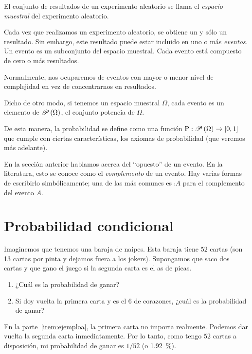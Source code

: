 El conjunto de resultados de un experimento aleatorio se llama el \emph{espacio muestral} del experimento aleatorio.

Cada vez que realizamos un experimento aleatorio, se obtiene un y sólo un resultado. Sin embargo, este resultado puede estar incluido en uno o más \emph{eventos.} Un evento es un subconjunto del espacio muestral. Cada evento está compuesto de cero o más resultados.

Normalmente, nos ocuparemos de eventos con mayor o menor nivel de complejidad en vez de concentrarnos en resultados.

Dicho de otro modo, si tenemos un espacio muestral \(\Omega\), cada evento es un elemento de \(\operatorname{\mathscr{P}}\left(\Omega\right)\), el conjunto potencia de \(\Omega\).

De esta manera, la probabilidad se define como una función \(\operatorname{P}: \operatorname{\mathscr{P}}\left(\Omega\right) \to [0,1]\) que cumple con ciertas características, los axiomas de probabilidad (que veremos más adelante).

En la sección anterior hablamos acerca del \enquote{opuesto} de un evento. En la literatura, esto se conoce como el \emph{complemento} de un evento. Hay varias formas de escribirlo simbólicamente; una de las más comunes es \(\comp{A}\) para el complemento del evento \(A\).

\informal
\section{Probabilidad condicional}

Imaginemos que tenemos una baraja de naipes. Esta baraja tiene \(52\) cartas (son 13 cartas por pinta y dejamos fuera a los jokers). Supongamos que saco dos cartas y que gano el juego si la segunda carta es el as de picas.

\begin{enumerate}[label=\alph*)]
	\item\label{item:ejemploa} ¿Cuál es la probabilidad de ganar?
	\item\label{item:ejemplob} Si doy vuelta la primera carta y es el 6 de corazones, ¿cuál es la probabilidad de ganar?
\end{enumerate}

En la parte~\ref{item:ejemploa}, la primera carta no importa realmente. Podemos dar vuelta la segunda carta inmediatamente. Por lo tanto, como tengo \(52\) cartas a disposición, mi probabilidad de ganar es \(1/52\) (o \qty{1.92}{\percent}).

